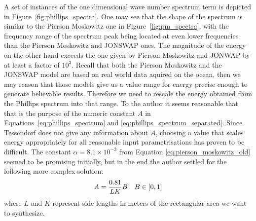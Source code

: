 %
A set of instances of the one dimensional wave number spectrum term is depicted 
in Figure~\ref{fig:phillips_spectra}. One may see that the shape of the 
spectrum is similar to the Pierson Moskowitz one in Figure~\ref{fig:pm_spectra}, 
with the frequency range of the spectrum peak being located at even lower 
frequencies than the Pierson Moskowitz and JONSWAP ones. The magnitude of the 
energy on the other hand exceeds the one given by Pierson Moskowitz and JONWAP 
by at least a factor of $10^3$. Recall that both the Pierson Moskowitz and the 
JONSWAP model are based on real world data aquired on the ocean, then we may 
reason that those models give us a value range for energy precise enough to 
generate believable results. Therefore we need to rescale the energy obtained 
from the Phillips spectrum into that range. To the author it seems reasonable 
that that is the purpose of the numeric constant $A$ in 
Equations~\ref{eq:phillips_spectrum} and \ref{eq:phillips_spectrum_separated}. 
Since Tessendorf does not give any information about $A$, choosing a value that 
scales energy appropriately for all reasonable input parametrisations has proven 
to be difficult. The constant $\alpha = 8.1 \times 10^{-3}$ from Equation
\ref{eq:pierson_moskowitz_old} seemed to be promising initially, but in the end 
the author settled for the following more complex solution:
\begin{align}
 A = \frac{0.81}{LK}B && B \in \interval{0}{1}
\end{align}
where $L$ and $K$ represent side lengths in meters of the rectangular area 
we want to synthesize.
%
